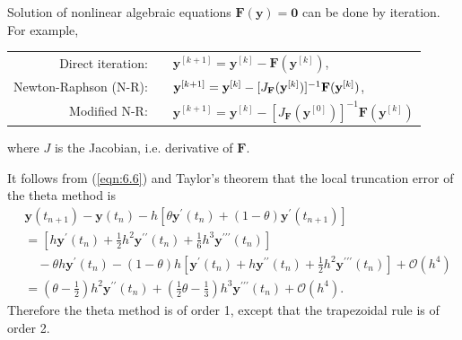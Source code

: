 \documentclass[a4paper]{article}
\begin{document}
Solution of nonlinear algebraic equations $\mathbf{F}(\mathbf{y})= \mathbf{0}$ can be done by iteration. For example,
\begin{center}
    \begin{tabular}{rl}
        Direct iteration:& $\quad \mathbf{y}^{[k+1]}=\mathbf{y}^{[k]}-\mathbf{F}(\mathbf{y}^{[k]})$,\\[0.5em]
Newton-Raphson (N-R):& $\quad \mathbf{y}^{[k+1]}=\mathbf{y}^{[k]}-[J_{\bf F}(\mathbf{y}^{[k]})]^{-1} \mathbf{F}(\mathbf{y}^{[k]})$,\\[0.5em]
Modified N-R:& $\quad \mathbf{y}^{[k+1]}=\mathbf{y}^{[k]}-[J_{\mathbf{F}}(\mathbf{y}^{[0]})]^{-1} \mathbf{F}(\mathbf{y}^{[k]})$
    \end{tabular}
\end{center}
where $J$ is the Jacobian, i.e. derivative of $\mathbf{F}$.

\begin{remark}
    It follows from (\ref{eqn:6.6}) and Taylor's theorem that the local truncation error of the theta method is
\[
\begin{aligned}
& \mathbf{y}\left(t_{n+1}\right)-\mathbf{y}\left(t_n\right)-h\left[\theta \mathbf{y}^{\prime}\left(t_n\right)+(1-\theta) \mathbf{y}^{\prime}\left(t_{n+1}\right)\right] \\
&= {\left[h \mathbf{y}^{\prime}\left(t_n\right)+\frac{1}{2} h^2 \mathbf{y}^{\prime \prime}\left(t_n\right)+\frac{1}{6} h^3 \mathbf{y}^{\prime \prime \prime}\left(t_n\right)\right] } \\
& \quad-\theta h \mathbf{y}^{\prime}\left(t_n\right)-(1-\theta) h\left[\mathbf{y}^{\prime}\left(t_n\right)+h \mathbf{y}^{\prime \prime}\left(t_n\right)+\frac{1}{2} h^2 \mathbf{y}^{\prime \prime \prime}\left(t_n\right)\right]+\mathcal{O}\left(h^4\right) \\
&=\left(\theta-\frac{1}{2}\right) h^2 \mathbf{y}^{\prime \prime}\left(t_n\right)+\left(\frac{1}{2} \theta-\frac{1}{3}\right) h^3 \mathbf{y}^{\prime \prime \prime}\left(t_n\right)+\mathcal{O}\left(h^4\right) .
\end{aligned}
\]
Therefore the theta method is of order 1, except that the trapezoidal rule is of order 2.
\end{remark}
\end{document}
